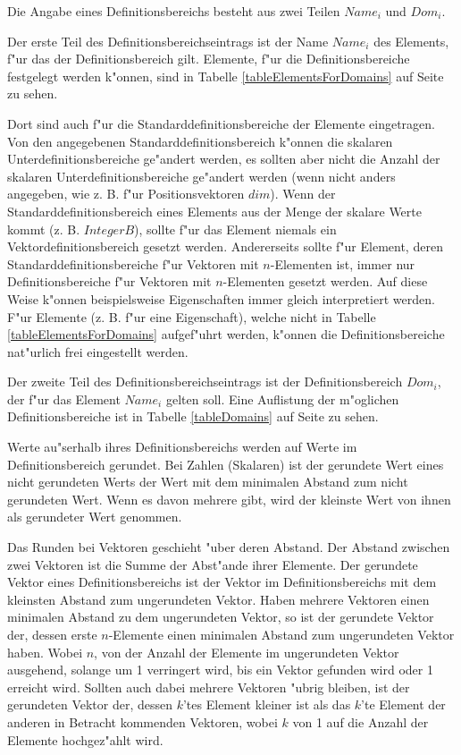 \bigskip\noindent
Die Angabe eines Definitionsbereichs besteht aus zwei Teilen $Name_i$ und $Dom_i$.

Der erste Teil des Definitionsbereichseintrags ist der Name $Name_i$ des Elements, f"ur das der Definitionsbereich gilt. Elemente, f"ur die Definitionsbereiche festgelegt werden k"onnen, sind in Tabelle \ref{tableElementsForDomains} auf Seite \pageref{tableElementsForDomains} zu sehen.

Dort sind auch f"ur die Standarddefinitionsbereiche der Elemente eingetragen. Von den angegebenen Standarddefinitionsbereich k"onnen die skalaren Unterdefinitionsbereiche ge"andert werden, es sollten aber nicht die Anzahl der skalaren Unterdefinitionsbereiche ge"andert werden (wenn nicht anders angegeben, wie z. B. f"ur Positionsvektoren $dim$). Wenn der Standarddefinitionsbereich eines Elements aus der Menge der skalare Werte kommt (z. B. $IntegerB$), sollte f"ur das Element niemals ein Vektordefinitionsbereich gesetzt werden. Andererseits sollte f"ur Element, deren Standarddefinitionsbereiche f"ur Vektoren mit $n$-Elementen ist, immer nur Definitionsbereiche f"ur Vektoren mit $n$-Elementen gesetzt werden. Auf diese Weise k"onnen beispielsweise Eigenschaften immer gleich interpretiert werden.
F"ur Elemente (z. B. f"ur eine Eigenschaft), welche nicht in Tabelle \ref{tableElementsForDomains} aufgef"uhrt werden, k"onnen die Definitionsbereiche nat"urlich frei eingestellt werden.

\bigskip\noindent
Der zweite Teil des Definitionsbereichseintrags ist der Definitionsbereich $Dom_i$, der f"ur das Element $Name_i$ gelten soll. Eine Auflistung der m"oglichen Definitionsbereiche ist in Tabelle \ref{tableDomains} auf Seite \pageref{tableDomains} zu sehen.

Werte au"serhalb ihres Definitionsbereichs werden auf Werte im Definitionsbereich gerundet. Bei Zahlen (Skalaren) ist der gerundete Wert eines nicht gerundeten Werts der Wert mit dem minimalen Abstand zum nicht gerundeten Wert. Wenn es davon mehrere gibt, wird der kleinste Wert von ihnen als gerundeter Wert genommen.

Das Runden bei Vektoren geschieht "uber deren Abstand. Der Abstand zwischen zwei Vektoren ist die Summe der Abst"ande ihrer Elemente. Der gerundete Vektor eines Definitionsbereichs ist der Vektor im Definitionsbereichs mit dem kleinsten Abstand zum ungerundeten Vektor. Haben mehrere Vektoren einen minimalen Abstand zu dem ungerundeten Vektor, so ist der gerundete Vektor der, dessen erste $n$-Elemente einen minimalen Abstand zum ungerundeten Vektor haben. Wobei $n$, von der Anzahl der Elemente im ungerundeten Vektor ausgehend, solange um 1 verringert wird, bis ein Vektor gefunden wird oder 1 erreicht wird. Sollten auch dabei mehrere Vektoren "ubrig bleiben, ist der gerundeten Vektor der, dessen $k$'tes Element kleiner ist als das $k$'te Element der anderen in Betracht kommenden Vektoren, wobei $k$ von 1 auf die Anzahl der Elemente hochgez"ahlt wird.

